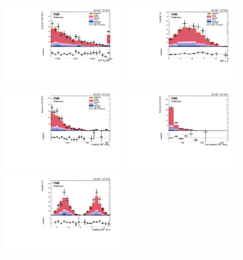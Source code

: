 \begin{figure}[!htbp]
\centering
\includegraphics[width=0.45\textwidth]{Plots/plots/DibosonBoostedElMuCuts13TeV_WjetControlRegion_Tighter_CHS_vbf_maxpt_jj_m.pdf}
\includegraphics[width=0.45\textwidth]{Plots/plots/DibosonBoostedElMuCuts13TeV_WjetControlRegion_Tighter_CHS_vbf_maxpt_jj_Deta.pdf}
\includegraphics[width=0.45\textwidth]{Plots/plots/DibosonBoostedElMuCuts13TeV_WjetControlRegion_Tighter_CHS_vbf_maxpt_j1_pt.pdf}
\includegraphics[width=0.45\textwidth]{Plots/plots/DibosonBoostedElMuCuts13TeV_WjetControlRegion_Tighter_CHS_vbf_maxpt_j2_pt.pdf}
\includegraphics[width=0.45\textwidth]{Plots/plots/DibosonBoostedElMuCuts13TeV_WjetControlRegion_Tighter_CHS_vbf_maxpt_j1_eta.pdf}

\end{figure}
